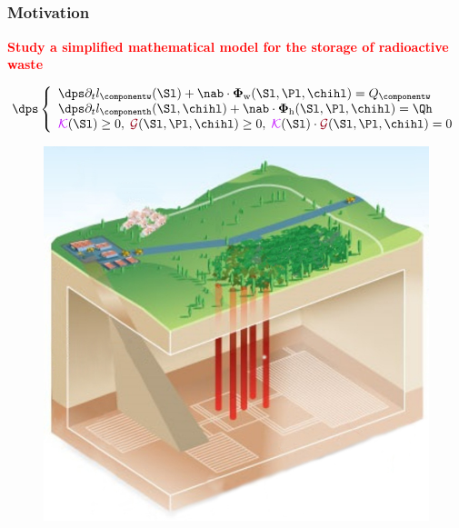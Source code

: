 \documentclass[aspectratio=169]{beamer}
\begin{document}
\subsection{}
\begin{frame}
\frametitle{Motivation}
\vspace{-0.2 cm}
\textcolor{red}{\textbf{Study a simplified mathematical model for the storage of radioactive waste}}
\begin{minipage}{0.6 \linewidth}
\begin{equation*}
\dps
\left\lbrace\begin{array}{llccc}
\dps \partial_t l_\componentw(\Sl) + \nab \cdot {\bm \Phi}_{\mathrm{w}}(\Sl,\Pl,\chihl) = Q_{\componentw}  \\
              \dps \partial_t l_\componenth(\Sl,\chihl)  + \nab \cdot {\bm \Phi}_{\mathrm{h}}(\Sl,\Pl,\chihl)=\Qh\\
\textcolor{electricpurple}{\mathcal{K}}(\Sl) \geq 0, \;  \textcolor{carmine}{\mathcal{G}}(\Sl,\Pl,\chihl) \geq 0, \; \textcolor{electricpurple}{\mathcal{K}}(\Sl) \cdot \textcolor{carmine}{\mathcal{G}}(\Sl,\Pl,\chihl)=0  
\end{array}
\right.
\end{equation*}
\end{minipage}
\hfill
\begin{minipage}{0.3 \linewidth}
\begin{figure}
\includegraphics[width=0.6 \textwidth]{stockage_dechets_radioactifs_sans_texte}
\end{figure}
\end{minipage}
\newline
{}
\end{frame}
\end{document}
